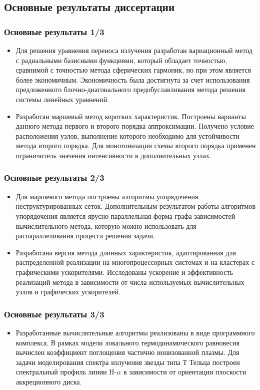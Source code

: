 \documentclass[unicode,aspectratio=43]{beamer}
\begin{document}
\subsection{Основные результаты диссертации}
\begin{frame}\frametitle{Основные результаты 1/3}
\begin{itemize}
  \item Для решения уравнения переноса излучения разработан вариационный метод с
радиальными базисными функциями, который обладает точностью, сравнимой с
точностью метода сферических гармоник, но при этом является более экономичным.
Экономичность была достигнута за счет использования предложенного блочно-диагонального 
предобуславливания метода решения системы линейных уравнений. 
  \item Разработан маршевый метод коротких характеристик. Построены варианты
данного метода первого и второго порядка аппроксимации. Получено условие
расположения узлов, выполнение которого необходимо для устойчивости метода
второго порядка. Для монотонизации схемы второго порядка применен ограничитель
значения интенсивности в дополнительных узлах.
\end{itemize}
\end{frame}

\begin{frame}\frametitle{Основные результаты 2/3}
\begin{itemize}
  \item Для маршевого метода построены алгоритмы упорядочения
неструктурированных сеток. Дополнительным результатом работы алгоритмов
упорядочения является ярусно-параллельная форма графа зависимостей
вычислительного метода, которую можно использовать для распараллеливания
процесса решения задачи. 
  \item Разработана версия метода длинных характеристик, адаптированная для
распределенной реализации на многопроцессорных системах и на кластерах с
графическими ускорителями. Исследованы ускорение и эффективность реализаций
метода в зависимости от числа используемых вычислительных узлов и графических
ускорителей.
\end{itemize}
\end{frame}

\begin{frame}\frametitle{Основные результаты 3/3}
\begin{itemize}
  \item Разработанные вычислительные алгоритмы реализованы в виде программного
комплекса. В рамках модели локального термодинамического равновесия вычислен
коэффициент поглощения частично ионизованной плазмы. Для задачи моделирования
спектра излучения звезды типа Т Тельца построен спектральный профиль линии
H-$\alpha$ в зависимости от ориентации плоскости аккреционного диска.
\end{itemize}
\end{frame}
\end{document}
